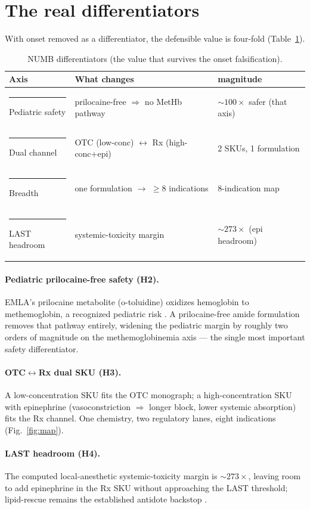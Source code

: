 \documentclass[11pt,a4paper]{article}
\newcommand{\tierdisc}[1]{\textcolor{#1}{\rule[0.05ex]{1.0ex}{1.0ex}}}
\newcommand{\tierGreen}{\tierdisc{green!60!black}}
\begin{document}
\section{The real differentiators}
\label{sec:diff}
With onset removed as a differentiator, the defensible value is four-fold
(Table~\ref{tab:diff}).

\begin{table}[t]
\centering
\caption{NUMB differentiators (the value that survives the onset falsification).}
\label{tab:diff}
\small
\begin{tabular}{@{}lll@{}}
\toprule
Axis & What changes & magnitude \\
\midrule
\tierGreen{} Pediatric safety & prilocaine-free $\Rightarrow$ no MetHb pathway & $\sim 100\times$ safer (that axis) \\
\tierGreen{} Dual channel & OTC (low-conc) $\leftrightarrow$ Rx (high-conc+epi) & 2 SKUs, 1 formulation \\
\tierGreen{} Breadth & one formulation $\to$ $\ge 8$ indications & 8-indication map \\
\tierGreen{} LAST headroom & systemic-toxicity margin & $\sim 273\times$ (epi headroom) \\
\bottomrule
\end{tabular}
\end{table}

\paragraph{Pediatric prilocaine-free safety (H2).}
EMLA's prilocaine metabolite (o-toluidine) oxidizes hemoglobin to
methemoglobin, a recognized pediatric risk \citep{methb}. A prilocaine-free
amide formulation removes that pathway entirely, widening the pediatric margin
by roughly two orders of magnitude on the methemoglobinemia axis --- the single
most important safety differentiator.

\paragraph{OTC$\leftrightarrow$Rx dual SKU (H3).}
A low-concentration SKU fits the OTC monograph; a high-concentration SKU with
epinephrine (vasoconstriction $\Rightarrow$ longer block, lower systemic
absorption) fits the Rx channel. One chemistry, two regulatory lanes, eight
indications (Fig.~\ref{fig:map}).

\paragraph{LAST headroom (H4).}
The computed local-anesthetic systemic-toxicity margin is $\sim 273\times$,
leaving room to add epinephrine in the Rx SKU without approaching the LAST
threshold; lipid-rescue remains the established antidote backstop
\citep{weinberg}.
\end{document}
